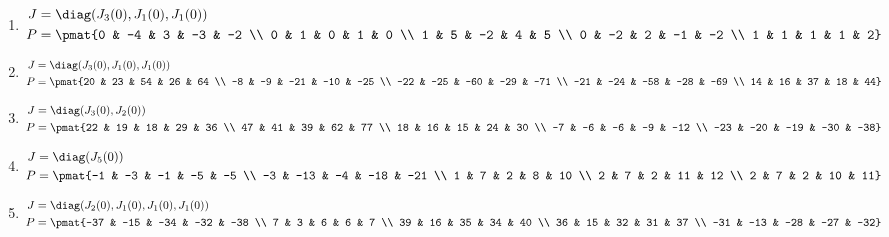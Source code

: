 \begin{enumerate}
\item

\begin{align*}
J &= \diag(J_{3}(0), J_{1}(0), J_{1}(0))\\
P &= \pmat{0 & -4 & 3 & -3 & -2 \\ 0 & 1 & 0 & 1 & 0 \\ 1 & 5 & -2 & 4 & 5 \\ 0 & -2 & 2 & -1 & -2 \\ 1 & 1 & 1 & 1 & 2}
\end{align*}

\item

\begin{align*}
J &= \diag(J_{3}(0), J_{1}(0), J_{1}(0))\\
P &= \pmat{20 & 23 & 54 & 26 & 64 \\ -8 & -9 & -21 & -10 & -25 \\ -22 & -25 & -60 & -29 & -71 \\ -21 & -24 & -58 & -28 & -69 \\ 14 & 16 & 37 & 18 & 44}
\end{align*}

\item

\begin{align*}
J &= \diag(J_{3}(0), J_{2}(0))\\
P &= \pmat{22 & 19 & 18 & 29 & 36 \\ 47 & 41 & 39 & 62 & 77 \\ 18 & 16 & 15 & 24 & 30 \\ -7 & -6 & -6 & -9 & -12 \\ -23 & -20 & -19 & -30 & -38}
\end{align*}

\item

\begin{align*}
J &= \diag(J_{5}(0))\\
P &= \pmat{-1 & -3 & -1 & -5 & -5 \\ -3 & -13 & -4 & -18 & -21 \\ 1 & 7 & 2 & 8 & 10 \\ 2 & 7 & 2 & 11 & 12 \\ 2 & 7 & 2 & 10 & 11}
\end{align*}

\item

\begin{align*}
J &= \diag(J_{2}(0), J_{1}(0), J_{1}(0), J_{1}(0))\\
P &= \pmat{-37 & -15 & -34 & -32 & -38 \\ 7 & 3 & 6 & 6 & 7 \\ 39 & 16 & 35 & 34 & 40 \\ 36 & 15 & 32 & 31 & 37 \\ -31 & -13 & -28 & -27 & -32}
\end{align*}


\end{enumerate}
